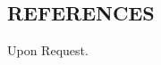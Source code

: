 \documentclass[line,margin]{res}
\begin{document}
\begin{resume}
\section{REFERENCES} 
  Upon Request.



%
% 
% 

\end{resume}
\end{document}
